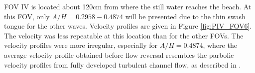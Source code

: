\documentclass[a4paper, 11pt, english, twoside, openright]{article}
\begin{document}
 FOV IV is located about 120cm from where the still water reaches the beach. At this FOV, only $A/H=0.2958-0.4874$ will be presented due to the thin swash tongue for the other waves. Velocity profiles are given in Figure \ref{fig:PIV_FOV6}. The velocity was less repeatable at this location than for the other FOVs. The velocity profiles were more irregular, especially for $A/H=0.4874$, where the average velocity profile obtained before flow reversal resembles the parbolic velocity profiles from fully developed turbulent channel flow, as described in \cite{white2006viscous}. %
\end{document}
